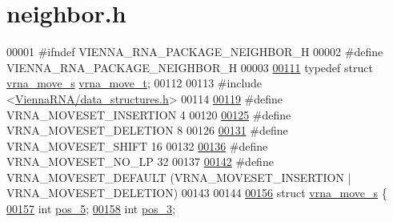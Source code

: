 \hypertarget{neighbor_8h_source}{}\section{neighbor.\+h}
\label{neighbor_8h_source}

\begin{DoxyCode}
00001 \textcolor{preprocessor}{#ifndef VIENNA\_RNA\_PACKAGE\_NEIGHBOR\_H}
00002 \textcolor{preprocessor}{#define VIENNA\_RNA\_PACKAGE\_NEIGHBOR\_H}
00003 
\mbox{\hyperlink{group__neighbors_ga08630e00206cd163ea29c462bf5f4755}{00111}} \textcolor{keyword}{typedef} \textcolor{keyword}{struct }\mbox{\hyperlink{group__neighbors_structvrna__move__s}{vrna\_move\_s}} \mbox{\hyperlink{group__neighbors_structvrna__move__s}{vrna\_move\_t}};
00112 
00113 \textcolor{preprocessor}{#include <\mbox{\hyperlink{data__structures_8h}{ViennaRNA/data\_structures.h}}>}
00114 
\mbox{\hyperlink{group__neighbors_gaf39028db9c70d3be528929182a3f2d5a}{00119}} \textcolor{preprocessor}{#define VRNA\_MOVESET\_INSERTION   4}
00120 
\mbox{\hyperlink{group__neighbors_gac05db9392c6647e3e9a6982096c5b384}{00125}} \textcolor{preprocessor}{#define VRNA\_MOVESET\_DELETION    8}
00126 
\mbox{\hyperlink{group__neighbors_ga68ea27c81de4b74e48b775c04052590b}{00131}} \textcolor{preprocessor}{#define VRNA\_MOVESET\_SHIFT       16}
00132 
\mbox{\hyperlink{group__neighbors_ga258084b251b218fba9398826435a4393}{00136}} \textcolor{preprocessor}{#define VRNA\_MOVESET\_NO\_LP       32}
00137 
\mbox{\hyperlink{group__neighbors_gaa5ffec4dd0d02df320f123e6888154d1}{00142}} \textcolor{preprocessor}{#define VRNA\_MOVESET\_DEFAULT     (VRNA\_MOVESET\_INSERTION | VRNA\_MOVESET\_DELETION)}
00143 
00144 
\mbox{\hyperlink{group__neighbors}{00156}} \textcolor{keyword}{struct }\mbox{\hyperlink{group__neighbors_structvrna__move__s}{vrna\_move\_s}} \{
\mbox{\hyperlink{group__neighbors_a8af908c74786675a456d0f20cc8fcb9b}{00157}}   \textcolor{keywordtype}{int} \mbox{\hyperlink{group__neighbors_a8af908c74786675a456d0f20cc8fcb9b}{pos\_5}};  
\mbox{\hyperlink{group__neighbors_a3849db905a45c4e399991df38705a36b}{00158}}   \textcolor{keywordtype}{int} \mbox{\hyperlink{group__neighbors_a3849db905a45c4e399991df38705a36b}{pos\_3}};  

\end{DoxyCode}
